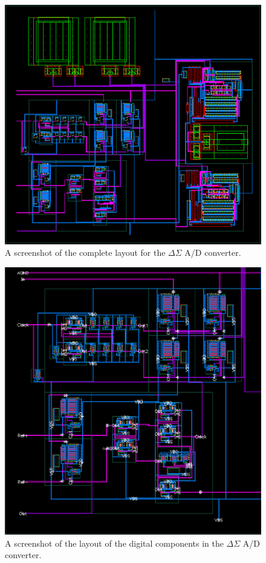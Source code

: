 \documentclass[journal,hidelinks]{IEEEtran}
\begin{document}
\begin{figure}[!htb]
  \centering
  \includegraphics[width=\columnwidth]{layout/adc.png}
  \caption{A screenshot of the complete layout for the $\Delta \Sigma$ A/D converter.}
  \label{fig:adc_layout}
\end{figure}

\begin{figure}[!htb]
  \centering
  \includegraphics[width=\columnwidth]{layout/adc_digital.png}
  \caption{A screenshot of the layout of the digital components in the $\Delta \Sigma$ A/D converter.}
  \label{fig:adc_digital_layout}
\end{figure}
\end{document}
